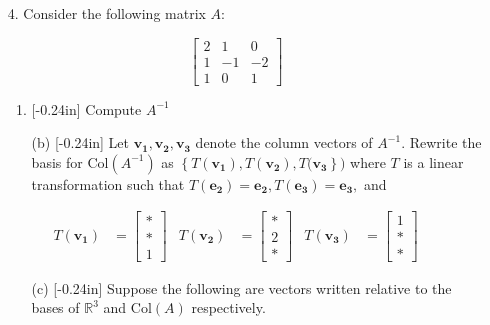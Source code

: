 \documentclass[letterpaper,12pt]{article}
\newcommand{\set}[1]{\left\{ #1 \right\}}
\theoremstyle{definition}
\begin{document}
\pagebreak
\begin{enumerate}
    \item[4.]  Consider the following matrix $A:$ \end{enumerate}
     $$\begin{bmatrix}
        2 & 1 & 0  \\
        1 & -1 & -2 \\
        1 & 0 & 1 
    \end{bmatrix}$$
\begin{enumerate}
\item[]
    \begin{enumerate}
        \item\reversemarginpar{}[-0.24in] Compute $A^{-1}$
    \end{enumerate}
\end{enumerate}
\pagebreak
\begin{enumerate}
    \item[]\begin{enumerate}
        \item[(b)]\reversemarginpar{}[-0.24in] Let $\mathbf{v_1}, \mathbf{v_2},\mathbf{v_3}$ denote the column vectors of $A^{-1}$. Rewrite the basis for $\mathrm{Col}(A^{-1})$ as $\set{T(\mathbf{v_1}),T(\mathbf{v_2}),T(\mathbf{v_3}})$ where $T$ is a linear transformation such that $T(\mathbf{e_2})=\mathbf{e_2},T(\mathbf{e_3})=\mathbf{e_3},$ and 
    \end{enumerate}
\end{enumerate}
\begin{align*}
            T(\mathbf{v_1}) &=\begin{bmatrix}
                * \\ * \\ 1
            \end{bmatrix} & T(\mathbf{v_2}) &=\begin{bmatrix}
                * \\ 2 \\ *
            \end{bmatrix} & T(\mathbf{v_3}) &=\begin{bmatrix}
                1 \\ * \\ *
            \end{bmatrix}
        \end{align*}
\pagebreak
\begin{enumerate}
    \item[] \begin{enumerate}
        \item[(c)] \reversemarginpar{}[-0.24in]  Suppose the following are vectors written relative to the bases of $\mathbb{R}^3$ and $\mathrm{Col}(A)$ respectively.
    \end{enumerate}
\end{enumerate}
\end{document}
